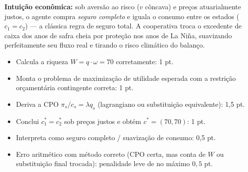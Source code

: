 \begin{solucao}
\textbf{Intuição econômica:} sob aversão ao risco ($v$ côncava) e preços atuarialmente justos, o agente compra \emph{seguro completo} e iguala o consumo entre os estados ($c_1=c_2$) --- a clássica regra de seguro total. A cooperativa troca o excedente de caixa dos anos de safra cheia por proteção nos anos de La Niña, suavizando perfeitamente seu fluxo real e tirando o risco climático do balanço.
\rubricalabel
\begin{itemize}
\item Calcula a riqueza $W=q\cdot\omega=70$ corretamente: 1 pt.
\item Monta o problema de maximização de utilidade esperada com a restrição orçamentária contingente correta: 1 pt.
\item Deriva a CPO $\pi_s/c_s=\lambda q_s$ (lagrangiano ou substituição equivalente): 1{,}5 pt.
\item Conclui $c_1^{*}=c_2^{*}$ sob preços justos e obtém $c^{*}=(70,70)$: 1 pt.
\item Interpreta como seguro completo / suavização de consumo: 0{,}5 pt.
\item Erro aritmético com método correto (CPO certa, mas conta de $W$ ou substituição final trocada): penalidade leve de no máximo $0{,}5$ pt.
\end{itemize}
\end{solucao}

